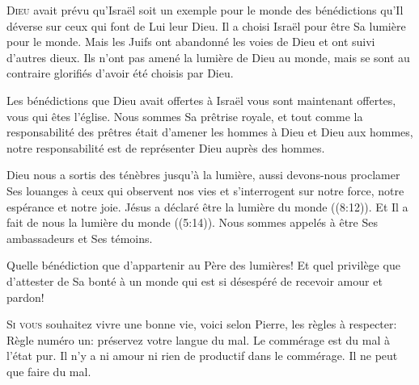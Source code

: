 
\lettrine{D}{ieu} avait prévu qu'Israël soit un exemple pour le monde
 des bénédictions qu'Il déverse sur ceux qui font de Lui leur Dieu.
 Il a choisi Israël pour être Sa lumière pour le monde.
 Mais les Juifs ont abandonné les voies de Dieu et ont suivi d'autres dieux.
 Ils n'ont pas amené la lumière de Dieu au monde, mais se sont au contraire
 glorifiés d'avoir été choisis par Dieu.

Les bénédictions que Dieu avait offertes à Israël vous sont maintenant offertes,
 vous qui êtes l'église. 
 Nous sommes Sa prêtrise royale, et tout comme la responsabilité des prêtres
 était d'amener les hommes à Dieu et Dieu aux hommes,
 notre responsabilité est de représenter Dieu auprès des hommes.


Dieu nous a sortis des ténèbres jusqu'à la lumière, aussi devons-nous proclamer
 Ses louanges à ceux qui observent nos vies et s'interrogent sur notre force,
 notre espérance et notre joie. Jésus a déclaré être
 \Og la lumière du monde \Fg{} ((8:12)).
 Et Il a fait de nous \Og la lumière du monde \Fg{} ((5:14)).
 Nous sommes appelés à être Ses ambassadeurs et Ses témoins.

Quelle bénédiction que d'appartenir au Père des lumières!
 Et quel privilège que d'attester de Sa bonté à un monde qui est si désespéré
 de recevoir amour et pardon! 

\dvrule






\lettrine{S}{i vous} souhaitez vivre une bonne vie,
 voici selon Pierre, les règles à respecter: \\[1ex]
Règle numéro un: préservez votre langue du mal.
 Le commérage est du mal à l'état pur. Il n'y a ni amour ni rien de productif
 dans le commérage. Il ne peut que faire du mal.

